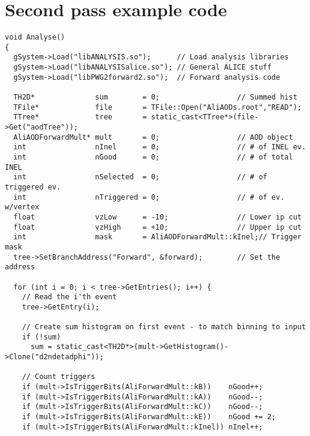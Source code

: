 \documentclass[11pt]{article}
\newcommand{\mult}[1][]{\ensuremath N_{\text{ch}#1}}
\newcommand{\dndeta}[1][]{{\ensuremath%
    \ifx|#1|\else\left.\fi%
    \frac{1}{N}\frac{d\mult{}}{d\eta}%
    \ifx|#1|\else\right|_{#1}\fi%
}}
\begin{document}
\section{Second pass example code}
\label{app:exa_pass2}
\begin{lstlisting}[caption={Example 2\textsuperscript{nd} pass code to
    do $\dndeta$},label={lst:example},frame=single,captionpos=b]
void Analyse()
{ 
  gSystem->Load("libANALYSIS.so");      // Load analysis libraries
  gSystem->Load("libANALYSISalice.so"); // General ALICE stuff
  gSystem->Load("libPWG2forward2.so");  // Forward analysis code

  TH2D*              sum        = 0;                  // Summed hist
  TFile*             file       = TFile::Open("AliAODs.root","READ");
  TTree*             tree       = static_cast<TTree*>(file->Get("aodTree"));
  AliAODForwardMult* mult       = 0;                  // AOD object
  int                nInel      = 0;                  // # of INEL ev.
  int                nGood      = 0;                  // # of total INEL
  int                nSelected  = 0;                  // # of triggered ev.
  int                nTriggered = 0;                  // # of ev. w/vertex
  float              vzLow      = -10;                // Lower ip cut
  float              vzHigh     = +10;                // Upper ip cut
  int                mask       = AliAODForwardMult::kInel;// Trigger mask
  tree->SetBranchAddress("Forward", &forward);        // Set the address

  for (int i = 0; i < tree->GetEntries(); i++) { 
    // Read the i'th event 
    tree->GetEntry(i);

    // Create sum histogram on first event - to match binning to input
    if (!sum) 
      sum = static_cast<TH2D*>(mult->GetHistogram()->Clone("d2ndetadphi"));
    
    // Count triggers 
    if (mult->IsTriggerBits(AliForwardMult::kB))    nGood++;
    if (mult->IsTriggerBits(AliForwardMult::kA))    nGood--;
    if (mult->IsTriggerBits(AliForwardMult::kC))    nGood--;
    if (mult->IsTriggerBits(AliForwardMult::kE))    nGood += 2;
    if (mult->IsTriggerBits(AliForwardMult::kInel)) nInel++;


\end{lstlisting}
\end{document}

